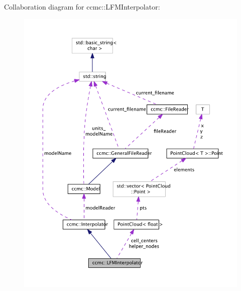 Collaboration diagram for ccmc\-:\-:L\-F\-M\-Interpolator\-:\nopagebreak
\begin{figure}[H]
\begin{center}
\leavevmode
\includegraphics[width=350pt]{classccmc_1_1_l_f_m_interpolator__coll__graph}
\end{center}
\end{figure}
